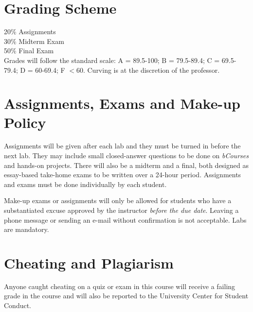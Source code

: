 \documentclass[letterpaper]{inzane_syllabus} %
\begin{document}
\section{Grading Scheme}

20\% Assignments \\
30\% Midterm Exam \\
50\% Final Exam \\

Grades will follow the standard scale: A = 89.5-100; B = 79.5-89.4; C = 69.5-79.4; D = 60-69.4; F  $<$60. Curving is at the discretion of the professor. 



\newpage %

\makeSide %


\vspace{0.5cm}
\section{Assignments, Exams and Make-up Policy}

Assignments will be given after each lab and they must be turned in before the next lab. They may include small closed-answer questions to be done on \emph{bCourses} and hands-on projects. There will also be a midterm  and a final, both designed as essay-based take-home exams to be written over a 24-hour period. Assignments and exams must be done individually by each student.

Make-up exams or assignments will only be allowed for students who have a substantiated excuse approved by the instructor \emph{before the due date}. Leaving a phone message or sending an e-mail without confirmation is not acceptable. Labs are mandatory.

\vspace{0.5cm}
\section{Cheating and Plagiarism}

Anyone caught cheating on a quiz or exam in this course will receive a failing grade in the course and will also be reported to the University Center for Student Conduct.
\end{document}
